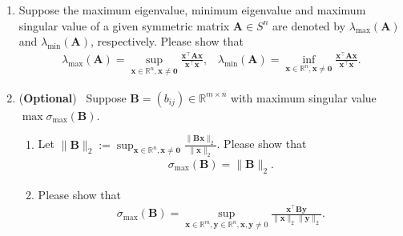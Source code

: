 \documentclass[11pt,letter,notitlepage]{article}
\theoremstyle{definition}
\begin{document}
\newpage
    \begin{exercise}
    \begin{enumerate}
        \item Suppose the maximum eigenvalue, minimum eigenvalue and maximum singular value of a given symmetric matrix $\mathbf{A}\in S^n$ are denoted by $\lambda_{\max}(\mathbf{A})$ and $ \lambda_{\min}(\mathbf{A})$, respectively. Please show that
        \begin{align*}
            \lambda_{\max}(\mathbf{A})=\sup_{\mathbf{x}\in\mathbb{R}^n, \mathbf{x}\not=\mathbf{0}} \frac{\mathbf{x}^\top\mathbf{A}\mathbf{x}}{\mathbf{x}^\top\mathbf{x}},\,\,\,\,\,
            \lambda_{\min}(\mathbf{A})=\inf_{\mathbf{x}\in\mathbb{R}^n, \mathbf{x}\not=\mathbf{0}} \frac{\mathbf{x}^\top\mathbf{A}\mathbf{x}}{\mathbf{x}^\top\mathbf{x}}.
        \end{align*}

        \item (\textbf{Optional}) ~Suppose $\mathbf{B}=(b_{ij})\in \mathbb{R}^{m\times n}$ with maximum singular value $\max\sigma_{\max}(\mathbf{B})$.
        \begin{enumerate}
            \item Let $\|\mathbf{B}\|_2:=\sup_{\mathbf{x}\in\mathbb{R}^n, \mathbf{x}\not=\mathbf{0}}\frac{\|\mathbf{Bx}\|_2}{\|\mathbf{x}\|_2}$. Please show that
             \begin{align*}
            \sigma_{\max}(\mathbf{B})=\|\mathbf{B}\|_2.
            \end{align*}

            \item Please show that
        \begin{align*}
            \sigma_{\max}(\mathbf{B})=\sup_{\mathbf{x}\in\mathbb{R}^m, \mathbf{y}\in\mathbb{R}^n, \mathbf{x},\mathbf{y}\not=0}\frac{\mathbf{x}^\top \mathbf{B}\mathbf{y}}{\|\mathbf{x}\|_2\|\mathbf{y}\|_2}.
        \end{align*}
        \end{enumerate}
    \end{enumerate}
    \end{exercise}

\newpage
\end{document}

